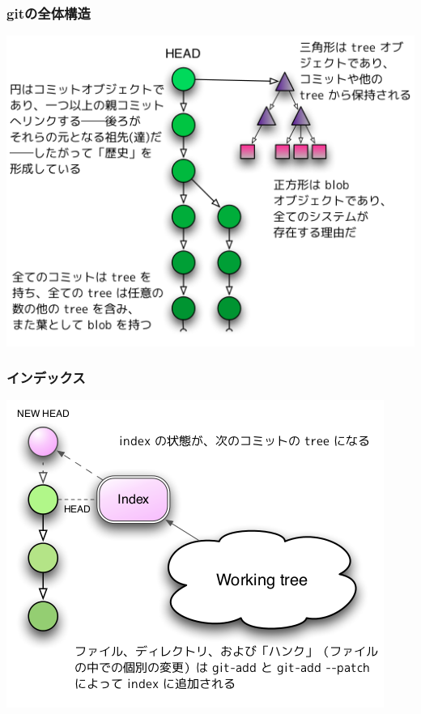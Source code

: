 \begin{frame}
  \frametitle{gitの全体構造}
  \begin{center}
    \includegraphics[height=.6\textheight]{12_ja.png}
  \end{center}
\end{frame}

\begin{frame}
  \frametitle{インデックス}
  \begin{center}
    \includegraphics[height=.6\textheight]{20_ja.png}
  \end{center}
\end{frame}


